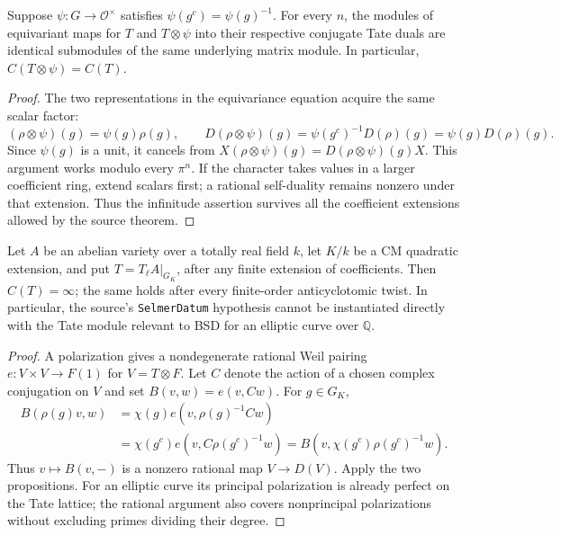 \begin{proposition}
\label{prop:anti-invariance}
Suppose $\psi:G\to\mathcal O^\times$ satisfies
$\psi(g^c)=\psi(g)^{-1}$.  For every $n$, the modules of equivariant maps
for $T$ and $T\otimes\psi$ into their respective conjugate Tate duals are
identical submodules of the same underlying matrix module.  In particular,
$C(T\otimes\psi)=C(T)$.
\end{proposition}
\begin{proof}
The two representations in the equivariance equation acquire the same
scalar factor:
\[
 (\rho\otimes\psi)(g)=\psi(g)\rho(g),\qquad
 D(\rho\otimes\psi)(g)=\psi(g^c)^{-1}D(\rho)(g)
                      =\psi(g)D(\rho)(g).
\]
Since $\psi(g)$ is a unit, it cancels from
$X(\rho\otimes\psi)(g)=D(\rho\otimes\psi)(g)X$.
This argument works modulo every $\pi^n$.
If the character takes values in a larger coefficient ring, extend
scalars first; a rational self-duality remains nonzero under that
extension.  Thus the infinitude assertion survives all the coefficient
extensions allowed by the source theorem.
\end{proof}

\begin{corollary}
Let $A$ be an abelian variety over a totally real field $k$, let $K/k$ be
a CM quadratic extension, and put $T=T_\ell A|_{G_K}$, after any finite
extension of coefficients.  Then $C(T)=\infty$; the same holds after
every finite-order anticyclotomic twist.  In particular, the source's
\texttt{SelmerDatum} hypothesis cannot be instantiated directly with the
Tate module relevant to BSD for an elliptic curve over $\mathbb Q$.
\end{corollary}
\begin{proof}
A polarization gives a nondegenerate rational Weil pairing
$e:V\times V\to F(1)$ for $V=T\otimes F$.
Let $C$ denote the action of a chosen complex conjugation on $V$ and set
$B(v,w)=e(v,Cw)$.  For $g\in G_K$,
\[
 \begin{split}
 B(\rho(g)v,w)
 &=\chi(g)e(v,\rho(g)^{-1}Cw)\\
 &=\chi(g^c)e(v,C\rho(g^c)^{-1}w)
 =B(v,\chi(g^c)\rho(g^c)^{-1}w).
 \end{split}
\]
Thus $v\mapsto B(v,-)$ is a nonzero rational map $V\to D(V)$.
Apply the two propositions.  For an elliptic curve its principal
polarization is already perfect on the Tate lattice; the rational
argument also covers nonprincipal polarizations without excluding primes
dividing their degree.
\end{proof}

